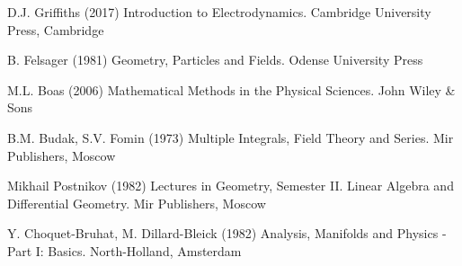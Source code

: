 % 
%

%
% 
% 
%
\begin{thebibliography}{99.}
%
%
%
 D.J. Griffiths (2017)
Introduction to Electrodynamics. Cambridge University Press, Cambridge

 B. Felsager (1981)
Geometry, Particles and Fields. Odense University Press

 M.L. Boas (2006)
Mathematical Methods in the Physical Sciences. John Wiley \& Sons

 B.M. Budak, S.V. Fomin (1973)
Multiple Integrals, Field Theory and Series. Mir Publishers, Moscow

 Mikhail Postnikov (1982)
Lectures in Geometry, Semester II. Linear Algebra and Differential Geometry. Mir Publishers, Moscow

 Y. Choquet-Bruhat, M. Dillard-Bleick (1982)
Analysis, Manifolds and Physics - Part I: Basics. North-Holland, Amsterdam

\end{thebibliography}

